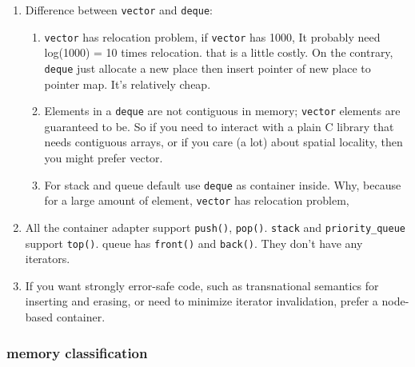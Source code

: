 \documentclass[a4paper,11pt,twoside]{book}
\begin{document}
\begin{itemize}
\begin{enumerate}
\item Difference between \texttt{vector} and \texttt{deque}:
\begin{enumerate}
\item \texttt{vector} has relocation problem, if \texttt{vector} has 1000, It probably need log(1000) = 10 times relocation. that is a little costly. On the contrary, \texttt{deque} just allocate a new place then insert pointer of new place to pointer map. It's relatively cheap.


\item Elements in a \texttt{deque} are not contiguous in memory; \texttt{vector} elements are guaranteed to be. So if you need to interact with a plain C library that needs contiguous arrays, or if you care (a lot) about spatial locality, then you might prefer vector.

\item For stack and queue default use \texttt{deque} as container inside. Why, because for a large amount of element, \texttt{vector} has relocation problem,
\end{enumerate}


\item All the container adapter support \texttt{push()}, \texttt{pop()}. \texttt{stack} and \texttt{priority\_queue} support \texttt{top()}. queue has \texttt{front()} and \texttt{back()}. They don't have any iterators.

\item If you want strongly error-safe code, such as transnational semantics for inserting and erasing, or need to minimize iterator invalidation, prefer a node-based container.



\end{enumerate}

\end{itemize}


\subsubsection{memory classification}
\end{document}

